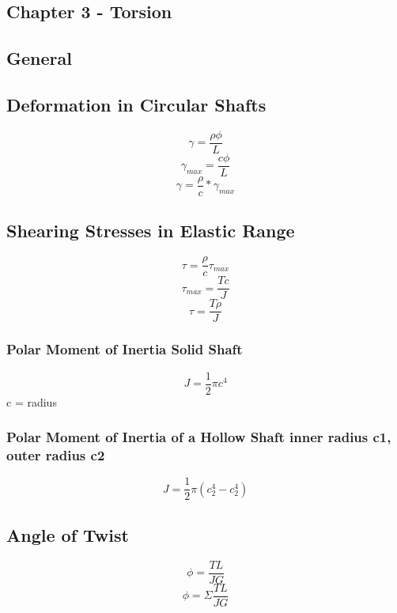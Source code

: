 \documentclass[10pt,landscape]{article}
\begin{document}
\begin{multicols}{3}
\section{Chapter 3 - Torsion}
\subsection{General}
\subsection{Deformation in Circular Shafts}
\begin{equation}
    \gamma=\frac{\rho\phi}{L}
\end{equation}
\begin{equation}
    \gamma_{max}=\frac{c\phi}{L}
\end{equation}
\begin{equation}
    \gamma=\frac{\rho}{c}*\gamma_{max}
\end{equation}
\subsection{Shearing Stresses in Elastic Range}
\begin{equation}
    \tau=\frac{\rho}{c}\tau_{max}
\end{equation}
\begin{equation}
    \tau_{max}=\frac{Tc}{J}
\end{equation}
\begin{equation}
    \tau=\frac{T\rho}{J}
\end{equation}
\subsubsection{Polar Moment of Inertia Solid Shaft}
\begin{equation}
    J=\frac{1}{2}\pi c^4
\end{equation}
c = radius
\subsubsection{Polar Moment of Inertia of a Hollow Shaft inner radius c1, outer radius c2}
\begin{equation}
    J=\frac{1}{2}\pi(c_2^4-c_2^4)
\end{equation}
\subsection{Angle of Twist}
\begin{equation}
    \phi=\frac{TL}{JG}
\end{equation}
\begin{equation}
    \phi=\Sigma\frac{TL}{JG}
\end{equation}

\end{multicols}
\end{document}
